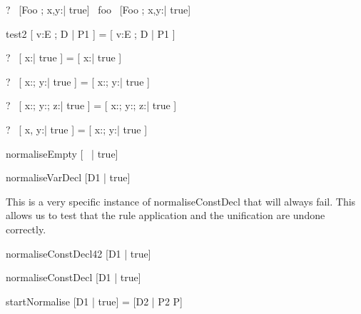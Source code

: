 \begin{zed}
  \vdash?~ [Foo ; x,y:\nat | true] ~foo~ [Foo ; x,y:\nat | true]
\end{zed}

\begin{zedrule}{test2}
  [ v:E ; D | P1 ] = [ v:E ; D | P1 ]
\end{zedrule}

\begin{zed}
  \vdash?~ [ x:\nat | true ] = [ x:\nat | true ]
\end{zed}

\begin{zed}
  \vdash?~ [ x:\nat; y:\nat | true ] = [ x:\nat; y:\nat | true ]
\end{zed}

\begin{zed}
  \vdash?~ [ x:\nat; y:\nat ; z:\nat | true ] =
           [ x:\nat; y:\nat ; z:\nat | true ]
\end{zed}

\begin{zed}
  \vdash?~ [ x, y:\nat | true ] = [ x:\nat; y:\nat | true ]
\end{zed}


\begin{zedrule}{normaliseEmpty}
   [~ | true] \unfoldsTo [~ | true]
\end{zedrule}

\begin{zedrule}{normaliseVarDecl}
   [D1 | true] \unfoldsTo [D2 | P2]
\derives
   [v:E; D1 | true] \unfoldsTo [v:E; D2 | P2]
\end{zedrule}

This is a very specific instance of normaliseConstDecl
that will always fail.  
This allows us to test that the rule application and the
unification are undone correctly.
\begin{zedrule}{normaliseConstDecl42}
   [D1 | true] 
\derives
   [v==42; D1 | true] \unfoldsTo [v:\{42\}; D2 | P2]
\end{zedrule}

\begin{zedrule}{normaliseConstDecl}
   [D1 | true] \unfoldsTo [D2 | P2]
\derives
   [v==E; D1 | true] \unfoldsTo [v:\{E\}; D2 | P2]
\end{zedrule}

\begin{zedrule}{startNormalise}
   [D1 | true] \unfoldsTo [D2 | P2]
\derives
   [D1 | P] = [D2 | P2 \land P]
\end{zedrule}

